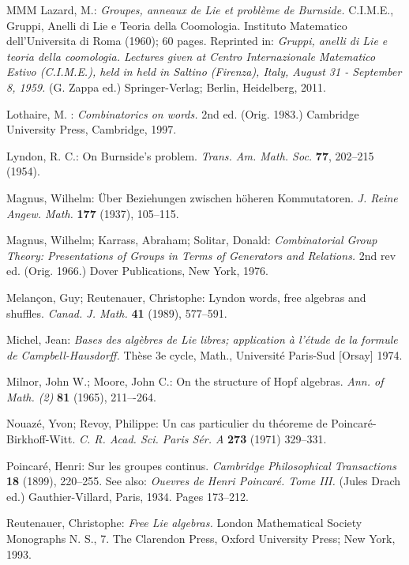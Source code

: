 \documentclass[11pt,a4paper]{amsart}
\newcommand{\gbibitem}[1]{ \bibitem{#1}}
\newcommand{\gbibitem}[1]{ \bibitem{#1}\rlap{\smash{${}^{^{[#1]}}$}}}
\newcommand{\gbibitem}[1]{ \bibitem{#1}}
\theoremstyle{definition}
\theoremstyle{plain}
\begin{document}
\begin{thebibliography}{MMM}
\gbibitem{L2}
Lazard, M.: \textit{Groupes, anneaux de Lie et probl\`eme de Burnside.} C.I.M.E., Gruppi,
Anelli di Lie e Teoria della Coomologia.
Instituto Matematico dell’Universita di Roma (1960); 60 pages.
Reprinted in:
\textit{Gruppi, anelli di Lie e teoria della coomologia.
Lectures given at Centro Internazionale Matematico Estivo (C.I.M.E.),
held in held in Saltino (Firenza), Italy,
August 31 - September 8, 1959.} (G. Zappa ed.)
Springer-Verlag; Berlin, Heidelberg, 2011.




\gbibitem{Lot}
Lothaire, M. : \textit{Combinatorics on words.} 2nd ed. (Orig. 1983.) Cambridge University Press, Cambridge, 1997.


\gbibitem{Lyn}
Lyndon, R. C.: On Burnside's problem. \textit{Trans. Am. Math. Soc.} \textbf{77}, 202--215 (1954).



\gbibitem{MM}
Magnus, Wilhelm:
\"Uber Beziehungen zwischen h\"oheren Kommutatoren.
\textit{J. Reine Angew. Math.}  \textbf{177}  (1937), 105--115.

\gbibitem{MKS}
Magnus, Wilhelm; Karrass, Abraham; Solitar, Donald:
\textit{Combinatorial Group Theory: Presentations of Groups in Terms of Generators and Relations.}
2nd rev ed. (Orig. 1966.) Dover Publications, New York, 1976.


\gbibitem{MR}
Melan\c{c}on, Guy; Reutenauer, Christophe:
Lyndon words, free algebras and shuffles.
\textit{Canad. J. Math.}  \textbf{41}  (1989),   577--591.



\gbibitem{Mch}
Michel, Jean:   \textit{Bases des algèbres de Lie libres; application à l'étude de la formule de Campbell-Hausdorff.} Thèse 3e cycle, Math., Université Paris-Sud [Orsay] 1974.


\gbibitem{MiMo}
Milnor, John W.; Moore, John C.:
On the structure of Hopf algebras.
\textit{Ann. of Math. (2)} \textbf{81} (1965), 211–-264.


\gbibitem{NR}
Nouaz\'e, Yvon; Revoy, Philippe:
Un cas particulier du th\'eoreme de Poincar\'e-Birkhoff-Witt.
\textit{C. R. Acad. Sci. Paris S\'er. A}  \textbf{273}  (1971) 329--331.


\gbibitem{P} Poincar\'e, Henri:
Sur les groupes continus. \textit{Cambridge Philosophical Transactions} \textbf{18} (1899), 220--255.
See also: \textit{Ouevres de Henri Poincar\'e. Tome III.} (Jules Drach ed.) Gauthier-Villard, Paris, 1934.
Pages 173--212.


\gbibitem{R}
Reutenauer, Christophe: \textit{Free Lie algebras.}
London Mathematical Society Monographs N. S., 7.
The Clarendon Press, Oxford University Press; New York, 1993.



\end{thebibliography}
\end{document}
